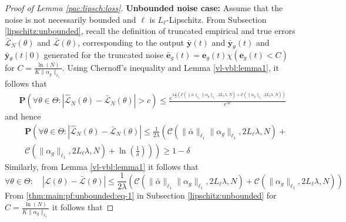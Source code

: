 \documentclass{article}
\newcommand{\e}{\mathbf{e}}
\newcommand{\y}{\mathbf{y}}
\newcommand{\bP}{\mathbf{P}}
\begin{document}
\begin{proof}[Proof of Lemma \ref{pac:lipsch:loss}]
  \textbf{Unbounded noise case:}
  Assume that the noise is not necessarily bounded and $\ell$  is $L_{\ell}$-Lipschitz. From Subsection \ref{lipschitz:unbounded},
  recall the definition of truncated empirical and true errors 
  $\bar{\mathcal{L}}_N(\theta)$ and $\bar{\mathcal{L}}(\theta)$, corresponding to the 
  output  $\bar{\y}(t)$ and $\bar{\y}_{\theta}(t)$ and $\bar{\y}_{\theta}(t \mid 0)$ generated for the truncated noise
  $\bar{\e}_g(t)=\e_g(t)\chi(\e_g(t) < C)$ for $C=\frac{\ln(N)}{K\|\alpha_g\|_{\ell_1}}$.
  Using Chernoff's inequality and Lemma \ref{vl-vbl:lemma1}, it follows that 
  \begin{equation}
    \label{pac:lipschitz:loss:eq05}
  \begin{aligned}
     \bP(\forall \theta \in \Theta: \left|\hat{\mathcal{L}}_N(\theta) - \bar{\mathcal{L}}_N(\theta)\right| > c) \le  
     \frac{e^{\lambda\frac{1}{2} \left(  \mathcal{C}(\|\bar{\alpha}\|_{\ell_1} \|\alpha_g\|_{\ell_1}, 2L_{\ell}\lambda,N)+
\mathcal{C}(\|\alpha_g\|_{\ell_1}, 2L_{\ell}\lambda,N)\right)}}{e^{\lambda c}}
  \end{aligned}
  \end{equation}
  and hence 
   \begin{equation}
    \label{pac:lipschitz:loss:eq5}
  \begin{aligned}
     & \bP\left(\forall \theta \in \Theta:  \left|\hat{\mathcal{L}}_N(\theta) - \bar{\mathcal{L}}_N(\theta)\right| \le 
      \frac{1}{2\lambda} \left(\mathcal{C}(\|\bar{\alpha}\|_{\ell_1} \|\alpha_g\|_{\ell_1}, 2L_{\ell}\lambda,N)+ \right. \right. \\
& \left. \left. \mathcal{C}(\|\alpha_g\|_{\ell_1}, 2L_{\ell}\lambda,N) + \ln\left(\frac{1}{\delta }\right)\right)\right)
      \ge 1-\delta
  \end{aligned}
  \end{equation}
   Similarly, from Lemma \ref{vl-vbl:lemma1} it follows that
   \begin{equation}
    \label{pac:lipschitz:loss:eq5.1}
    \forall \theta \in \Theta: \quad
    |\mathcal{L}(\theta) - \mathcal{\bar{L}}(\theta)| \le  
   \frac{1}{2\lambda} \left( \mathcal{C}(\|\bar{\alpha}\|_{\ell_1} \|\alpha_g\|_{\ell_1}, 2L_{\ell}\lambda,N)+
    \mathcal{C}(\|\alpha_g\|_{\ell_1}, 2L_{\ell}\lambda,N)\right) 
   \end{equation}
   From \eqref{thm:main:pf:unbounded:eq-1} in Subsection \ref{lipschitz:unbounded} for $C=\frac{\ln(N)}{K\|\alpha_g\|_{\ell_1}}$ it follows that

\end{proof}
\end{document}
